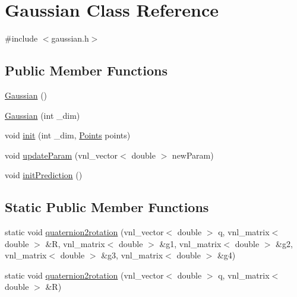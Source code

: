 \hypertarget{class_gaussian}{\section{\-Gaussian \-Class \-Reference}
\label{class_gaussian}
}


{\ttfamily \#include $<$gaussian.\-h$>$}

\subsection*{\-Public \-Member \-Functions}
\begin{DoxyCompactItemize}
\item 
\hyperlink{class_gaussian_aa201bf4a8fe1192c9a701e9537691426}{\-Gaussian} ()
\item 
\hyperlink{class_gaussian_adf41f13b444bf52b9626cb80719e4955}{\-Gaussian} (int \-\_\-dim)
\item 
void \hyperlink{class_gaussian_adf54537aeb68ac96fc3dc0bd42224216}{init} (int \-\_\-dim, \hyperlink{gaussian_8h_a2786dfc8a28e30d6b6385f709a158a37}{\-Points} points)
\item 
void \hyperlink{class_gaussian_a6d157086ac90e226afd46887fa43c5a8}{update\-Param} (vnl\-\_\-vector$<$ double $>$ new\-Param)
\item 
void \hyperlink{class_gaussian_a8e447c419d940ee28016c56bf1c3fa6c}{init\-Prediction} ()
\end{DoxyCompactItemize}
\subsection*{\-Static \-Public \-Member \-Functions}
\begin{DoxyCompactItemize}
\item 
static void \hyperlink{class_gaussian_a7c8e5d982d6c20e36c68d3d042f0e9c5}{quaternion2rotation} (vnl\-\_\-vector$<$ double $>$ q, vnl\-\_\-matrix$<$ double $>$ \&\-R, vnl\-\_\-matrix$<$ double $>$ \&g1, vnl\-\_\-matrix$<$ double $>$ \&g2, vnl\-\_\-matrix$<$ double $>$ \&g3, vnl\-\_\-matrix$<$ double $>$ \&g4)
\item 
static void \hyperlink{class_gaussian_aa3bbdc57cb1715d5e97f28e277649ced}{quaternion2rotation} (vnl\-\_\-vector$<$ double $>$ q, vnl\-\_\-matrix$<$ double $>$ \&\-R)
\end{DoxyCompactItemize}
